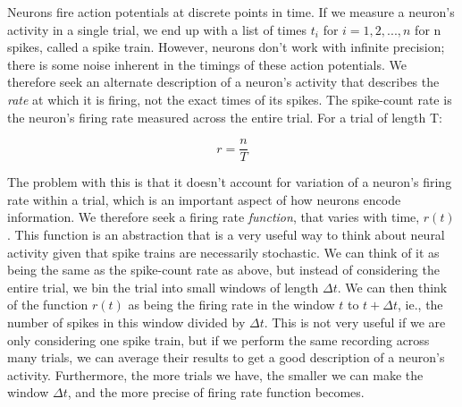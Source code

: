 \documentclass{article}
\begin{document}
Neurons fire action potentials at discrete points in time. If we measure a neuron's activity in a single trial, we end up with a list of times $t_i$ for $i = 1,2,...,n$ for n spikes, called a spike train. However, neurons don't work with infinite precision; there is some noise inherent in the timings of these action potentials. We therefore seek an alternate description of a neuron's activity that describes the \textit{rate} at which it is firing, not the exact times of its spikes. The spike-count rate is the neuron's firing rate measured across the entire trial. For a trial of length T:

\begin{equation*}
    r = \frac{n}{T}
\end{equation*}

The problem with this is that it doesn't account for variation of a neuron's firing rate within a trial, which is an important aspect of how neurons encode information. We therefore seek a firing rate \textit{function}, that varies with time, $r(t)$. This function is an abstraction that is a very useful way to think about neural activity given that spike trains are necessarily stochastic. We can think of it as being the same as the spike-count rate as above, but instead of considering the entire trial, we bin the trial into small windows of length $\Delta t$. We can then think of the function $r(t)$ as being the firing rate in the window $t$ to $t+\Delta t$, ie., the number of spikes in this window divided by $\Delta t$. This is not very useful if we are only considering one spike train, but if we perform the same recording across many trials, we can average their results to get a good description of a neuron's activity. Furthermore, the more trials we have, the smaller we can make the window $\Delta t$, and the more precise of firing rate function becomes.\\
\end{document}
